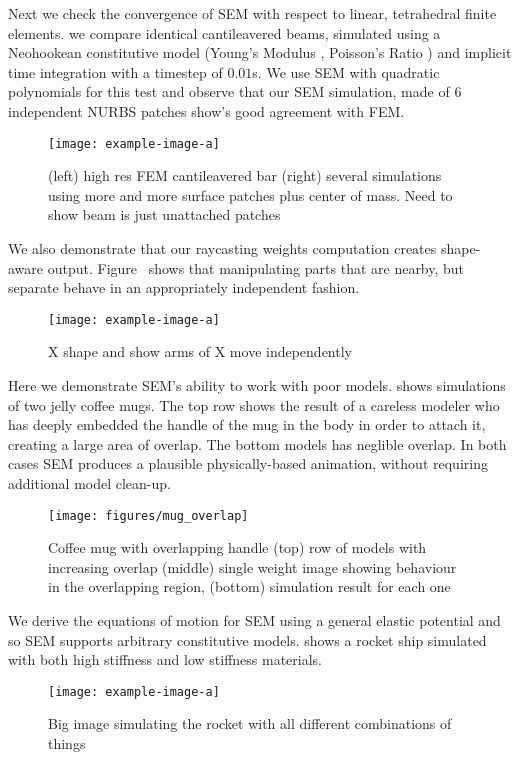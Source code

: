 Next we check the convergence of SEM with respect to linear, tetrahedral finite elements.  we compare identical cantileavered beams, simulated using 
a Neohookean constitutive model (Young's Modulus , Poisson's Ratio ) and implicit time integration with a timestep of $0.01$s. 
We use SEM with quadratic polynomials for this test and observe that our SEM simulation, made of 6 independent NURBS patches show's good agreement with FEM.
\begin{figure}
  \texttt{[image: example-image-a]}
  \caption{(left) high res FEM cantileavered bar (right) several simulations using more and more surface patches plus center of mass. Need to show beam is just  unattached patches}
  \label{fig:convergence}
\end{figure}

We also demonstrate that our raycasting weights computation creates shape-aware output. Figure~ shows that manipulating
parts that are nearby, but separate  behave in an appropriately independent fashion. 
\begin{figure}
  \texttt{[image: example-image-a]}
  \caption{X shape and show arms of X move independently}
  \label{fig:independence}
\end{figure}

Here we demonstrate SEM's ability to work with poor models.  shows simulations of two jelly coffee mugs. 
The top row shows the result of a careless modeler who has deeply embedded the handle of the mug in the body in order to attach it, creating a large area of overlap.
The bottom models has neglible overlap. 
In both cases SEM produces a plausible physically-based animation, without requiring additional model clean-up.
\begin{figure}
  \texttt{[image: figures/mug\_overlap]}
  \caption{Coffee mug with overlapping handle (top) row of models with increasing overlap (middle) single weight image showing behaviour in the overlapping region, (bottom) simulation result for each one}
  \label{fig:badmodels}
\end{figure}

We derive the equations of motion for SEM using a general elastic potential and so SEM supports arbitrary constitutive models.  shows a 
rocket ship simulated with both high stiffness and low stiffness materials. 
\begin{figure}
  \texttt{[image: example-image-a]}
  \caption{Big image simulating the rocket with all different combinations of things}
  \label{fig:materials}
\end{figure}



